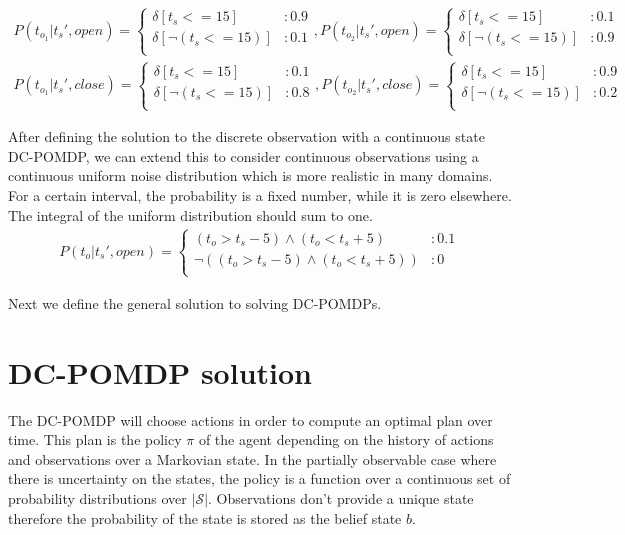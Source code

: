 \documentclass{article} %
\begin{document}
\begin{align}
P(t_{o_1}|t_s',open) = 
\begin{cases}
 \delta\left[ t_s <= 15 \right] &: 0.9 \\
 \delta\left[ \neg (t_s <= 15)\right] &: 0.1 \\
\end{cases}\nonumber
, 
P(t_{o_2}|t_s',open) = 
\begin{cases}
 \delta\left[ t_s <= 15 \right] &: 0.1 \\
 \delta\left[ \neg (t_s <= 15)\right] &: 0.9 \\
\end{cases}\nonumber
\\
P(t_{o_1}|t_s',close) = 
\begin{cases}
 \delta\left[ t_s <= 15 \right] &: 0.1 \\
 \delta\left[ \neg (t_s <= 15)\right] &: 0.8 \\
\end{cases}\nonumber
,
P(t_{o_2}|t_s',close) = 
\begin{cases}
 \delta\left[ t_s <= 15 \right] &: 0.9 \\
 \delta\left[ \neg (t_s <= 15)\right] &: 0.2 \\
\end{cases} \nonumber
\end{align}

After defining the solution to the discrete observation with a continuous state DC-POMDP, we can extend this to consider continuous observations using a continuous uniform noise distribution which is more realistic in many domains. For a certain interval, the probability is a fixed number, while it is zero elsewhere. The integral of the uniform distribution should sum to one. 
\begin{align}
P(t_o|t_s',open) = 
\begin{cases}
 (t_o>t_s-5) \wedge (t_o<t_s+5) &: 0.1 \\
 \neg((t_o>t_s-5) \wedge (t_o<t_s+5)) &: 0 \\
\end{cases}\nonumber
\end{align}

Next we define the general solution to solving DC-POMDPs. 

\section{DC-POMDP solution}
The DC-POMDP will choose actions in order to compute an optimal plan over time. This plan is the policy $\pi$ of the agent  depending on the history of actions and observations over a Markovian state. In the partially observable case where there is uncertainty on the states, the policy is a function over a continuous set of probability distributions over $|\mathcal{S}|$. Observations don't provide a unique state therefore the probability of the state is stored as the belief state $b$.
\end{document}
